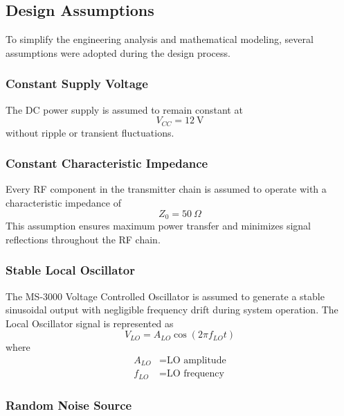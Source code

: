 \documentclass[12pt,a4paper]{report}
\begin{document}
	
	\subsection{Design Assumptions}
	
	To simplify the engineering analysis and mathematical modeling, several assumptions were adopted during the design process.
	
	\subsubsection*{Constant Supply Voltage}
	
	The DC power supply is assumed to remain constant at
	\begingroup
	\setlength{\mathindent}{0pt}
	\begin{equation}
		V_{CC} = 12\ \text{V}
	\end{equation}
	\endgroup
	without ripple or transient fluctuations.
	
	\subsubsection*{Constant Characteristic Impedance}
	
	Every RF component in the transmitter chain is assumed to operate with a characteristic impedance of
	\begin{equation}
		Z_0 = 50\ \Omega
	\end{equation}
	This assumption ensures maximum power transfer and minimizes signal reflections throughout the RF chain.
	
	\subsubsection*{Stable Local Oscillator}
	
	The MS-3000 Voltage Controlled Oscillator is assumed to generate a stable sinusoidal output with negligible frequency drift during system operation. The Local Oscillator signal is represented as
	\begin{equation}
		V_{LO} = A_{LO} \cos(2\pi f_{LO} t)
	\end{equation}
	where
	\begin{align*}
		A_{LO} &= \text{LO amplitude} \\
		f_{LO} &= \text{LO frequency}
	\end{align*}
	
	\subsubsection*{Random Noise Source}
	
\end{document}
